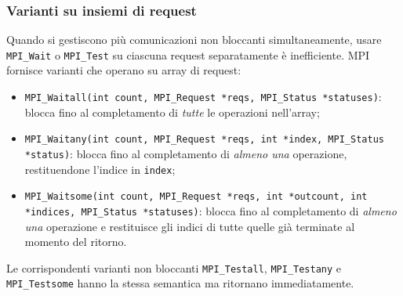 \subsubsection{Varianti su insiemi di request}
Quando si gestiscono più comunicazioni non bloccanti simultaneamente, usare \texttt{MPI\_Wait} o \texttt{MPI\_Test} su ciascuna request separatamente è inefficiente. MPI fornisce varianti che operano su array di request:

\begin{itemize}
    \item \texttt{MPI\_Waitall(int count, MPI\_Request *reqs, MPI\_Status *statuses)}: blocca fino al completamento di \emph{tutte} le operazioni nell'array;
    \item \texttt{MPI\_Waitany(int count, MPI\_Request *reqs, int *index, MPI\_Status *status)}: blocca fino al completamento di \emph{almeno una} operazione, restituendone l'indice in \texttt{index};
    \item \texttt{MPI\_Waitsome(int count, MPI\_Request *reqs, int *outcount, int *indices, MPI\_Status *statuses)}: blocca fino al completamento di \emph{almeno una} operazione e restituisce gli indici di tutte quelle già terminate al momento del ritorno.
\end{itemize}
Le corrispondenti varianti non bloccanti \texttt{MPI\_Testall}, \texttt{MPI\_Testany} e \texttt{MPI\_Testsome} hanno la stessa semantica ma ritornano immediatamente.

